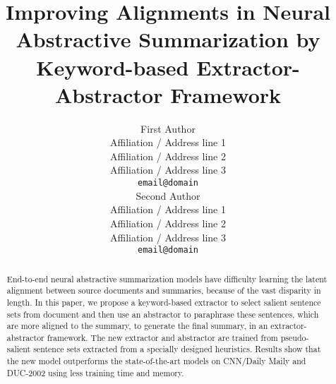 \documentclass[11pt,a4paper]{article}
\title{Improving Alignments in Neural Abstractive Summarization by Keyword-based Extractor-Abstractor Framework }
\author{First Author \\
  Affiliation / Address line 1 \\
  Affiliation / Address line 2 \\
  Affiliation / Address line 3 \\
  \texttt{email@domain} \\\And
  Second Author \\
  Affiliation / Address line 1 \\
  Affiliation / Address line 2 \\
  Affiliation / Address line 3 \\
  \texttt{email@domain} \\}
\date{}
\date{}
\theoremstyle{definition}
\newcommand{\KZ}[1]{\textcolor{blue}{Kenny: #1}}
\newcommand{\JQ}[1]{\textcolor{red}{JQ: #1}}
\begin{document}
\maketitle

\begin{abstract}
End-to-end neural abstractive summarization 
models have difficulty learning the latent alignment between 
source documents and summaries, because of the
vast disparity in length.
In this paper, we propose a keyword-based extractor
to select salient sentence sets from document 
and then use an abstractor to paraphrase these sentences, 
which are more aligned to 
the summary, to generate the final summary, in an extractor-abstractor framework.
The new extractor and abstractor are trained from pseudo-salient sentence sets
extracted from a specially designed heuristics.
Results show that the new model outperforms the state-of-the-art models
on CNN/Daily Maily and DUC-2002 using less training time and memory.



\end{abstract}
\end{document}
